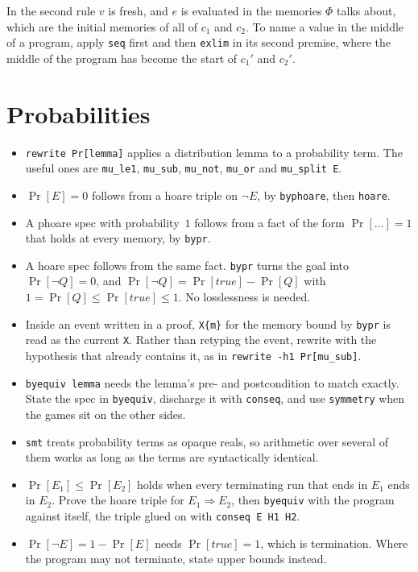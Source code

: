 \documentclass[10pt,a4paper]{article}
\newcommand{\ec}{\lstinline[basicstyle=\small\ttfamily]}
\begin{document}
\noindent
In the second rule $v$ is fresh, and $e$ is evaluated in the memories $\Phi$ talks about, which are the initial memories of all of $c_1$ and $c_2$.
To name a value in the middle of a program, apply \ec|seq| first and then \ec|exlim| in its second premise, where the middle of the program has become the start of $c_1'$ and $c_2'$.



\section{Probabilities}\label{sec:pr}

\begin{itemize}
  \item \ec|rewrite Pr[lemma]| applies a distribution lemma to a probability term.
    The useful ones are \ec|mu_le1|, \ec|mu_sub|, \ec|mu_not|, \ec|mu_or| and \ec|mu_split E|.
  \item $\Pr[E] = 0$ follows from a hoare triple on $\neg E$, by \ec|byphoare|, then \ec|hoare|.
  \item A phoare spec with probability~$1$ follows from a fact of the form $\Pr[\dots] = 1$ that holds at every memory, by \ec|bypr|.
  \item A hoare spec follows from the same fact.
    \ec|bypr| turns the goal into $\Pr[\neg Q] = 0$, and $\Pr[\neg Q] = \Pr[\mathit{true}] - \Pr[Q]$ with $1 = \Pr[Q] \le \Pr[\mathit{true}] \le 1$.
    No losslessness is needed.
  \item Inside an event written in a proof, \ec|X{m}| for the memory bound by \ec|bypr| is read as the current \ec|X|.
    Rather than retyping the event, rewrite with the hypothesis that already contains it, as in \ec|rewrite -h1 Pr[mu_sub]|.
  \item \ec|byequiv lemma| needs the lemma's pre- and postcondition to match exactly.
    State the spec in \ec|byequiv|, discharge it with \ec|conseq|, and use \ec|symmetry| when the games sit on the other sides.
  \item \ec|smt| treats probability terms as opaque reals, so arithmetic over several of them works as long as the terms are syntactically identical.
  \item $\Pr[E_1] \le \Pr[E_2]$ holds when every terminating run that ends in $E_1$ ends in $E_2$.
    Prove the hoare triple for $E_1 \Rightarrow E_2$, then \ec|byequiv| with the program against itself, the triple glued on with \ec|conseq E H1 H2|.
  \item $\Pr[\neg E] = 1 - \Pr[E]$ needs $\Pr[\mathit{true}] = 1$, which is termination.
    Where the program may not terminate, state upper bounds instead.
\end{itemize}
\end{document}
